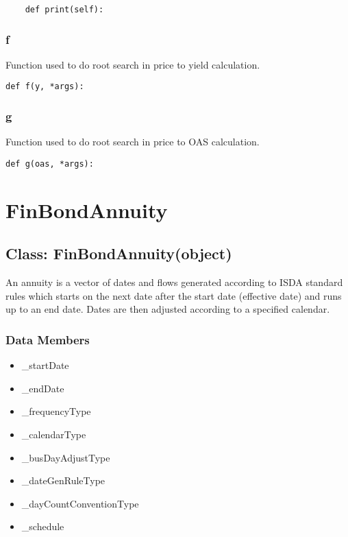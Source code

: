 \documentclass[twoside,11pt]{book}
\begin{document}
\begin{lstlisting}
    def print(self):
\end{lstlisting}

\subsubsection*{{\bf f}}
Function used to do root search in price to yield calculation.  

\begin{lstlisting}
def f(y, *args):
\end{lstlisting}

\subsubsection*{{\bf g}}
Function used to do root search in price to OAS calculation.  

\begin{lstlisting}
def g(oas, *args):
\end{lstlisting}

\newpage
\section{FinBondAnnuity}

\subsection*{Class: FinBondAnnuity(object)}
An annuity is a vector of dates and flows generated according to ISDA standard rules which starts on the next date after the start date (effective date) and runs up to an end date. Dates are then adjusted according to a specified calendar.  

\subsubsection*{Data Members}
\begin{itemize}
\item{\_startDate}
\item{\_endDate}
\item{\_frequencyType}
\item{\_calendarType}
\item{\_busDayAdjustType}
\item{\_dateGenRuleType}
\item{\_dayCountConventionType}
\item{\_schedule}
\end{itemize}
\end{document}
